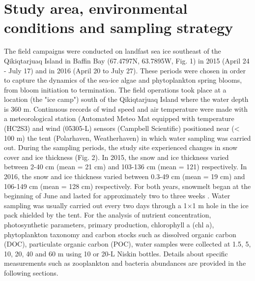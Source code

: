 \documentclass[essd, manuscript]{copernicus}
\begin{document}
\section{Study area, environmental conditions and sampling strategy}

The field campaigns were conducted on landfast sea ice southeast of the Qikiqtarjuaq Island in Baffin Bay (67.4797N, 63.7895W, Fig. 1) in 2015 (April 24 - July 17) and in 2016 (April 20 to July 27). These periods were chosen in order to capture the dynamics of the sea-ice algae and phytoplankton spring blooms, from bloom initiation to termination. The field operations took place at a location (the "ice camp") south of the Qikiqtarjuaq Island where the water depth is 360 m. Continuous records of wind speed and air temperature were made with a meteorological station (Automated Meteo Mat equipped with temperature (HC2S3) and wind (05305-L) sensors (Campbell Scientific) positioned near (< 100 m) the tent (Polarhaven, Weatherhaven) in which water sampling was carried out. During the sampling periods, the study site experienced changes in snow cover and ice thickness (Fig. 2). In 2015, the snow and ice thickness varied between 2-40 cm (mean = 21 cm) and 103-136 cm (mean = 121) respectively. In 2016, the snow and ice thickness varied between 0.3-49 cm (mean = 19 cm) and 106-149 cm (mean = 128 cm) respectively. For both years, snowmelt began at the beginning of June and lasted for approximately two to three weeks \citep{Oziel2019}. Water sampling was usually carried out every two days through a 1$\times$1 m hole in the ice pack shielded by the tent. For the analysis of nutrient concentration, photosynthetic parameters, primary production, chlorophyll a (chl a), phytoplankton taxonomy and carbon stocks such as dissolved organic carbon (DOC), particulate organic carbon (POC), water samples were collected at 1.5, 5, 10, 20, 40 and 60 m using 10 or 20-L Niskin bottles. Details about specific measurements such as zooplankton and bacteria abundances are provided in the following sections.
\end{document}
